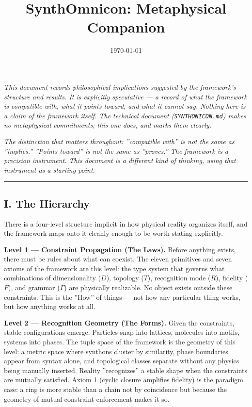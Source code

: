 \documentclass[12pt,a4paper]{article}
\begin{document}
\title{SynthOmnicon: Metaphysical Companion}
\date{\today}

\maketitle

\emph{This document records philosophical implications suggested by the framework's structure and results. It is explicitly speculative --- a record of what the framework is compatible with, what it points toward, and what it cannot say. Nothing here is a claim of the framework itself. The technical document (\texttt{SYNTHONICON.md}) makes no metaphysical commitments; this one does, and marks them clearly.}

\emph{The distinction that matters throughout: ''compatible with'' is not the same as ''implies.'' ''Points toward'' is not the same as ''proves.'' The framework is a precision instrument. This document is a different kind of thinking, using that instrument as a starting point.}

\begin{center}
\rule{0.5\textwidth}{0.4pt}
\end{center}

\subsection{I. The Hierarchy}

There is a four-level structure implicit in how physical reality organizes itself, and the framework maps onto it cleanly enough to be worth stating explicitly.

\textbf{Level 1 --- Constraint Propagation (The Laws).} Before anything exists, there must be rules about what can coexist. The eleven primitives and seven axioms of the framework are this level: the type system that governs what combinations of dimensionality ($D$), topology ($T$), recognition mode ($R$), fidelity ($F$), and grammar ($\Gamma$) are physically realizable. No object exists outside these constraints. This is the ''How'' of things --- not how any particular thing works, but how anything works at all.

\textbf{Level 2 --- Recognition Geometry (The Forms).} Given the constraints, stable configurations emerge. Particles snap into lattices, molecules into motifs, systems into phases. The tuple space of the framework is the geometry of this level: a metric space where synthons cluster by similarity, phase boundaries appear from syntax alone, and topological classes separate without any physics being manually inserted. Reality ''recognizes'' a stable shape when the constraints are mutually satisfied. Axiom 1 (cyclic closure amplifies fidelity) is the paradigm case: a ring is more stable than a chain not by coincidence but because the geometry of mutual constraint enforcement makes it so.
\end{document}
